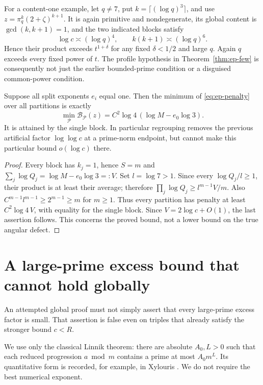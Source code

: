 For a content-one example, let $q\ne7$, put $k=\lceil(\log q)^3\rceil$, and
use $z=\pi_q^k(2+\zeta)^{k+1}$. It is again primitive and nondegenerate,
its global content is $\gcd(k,k+1)=1$, and the two indicated blocks satisfy
\[
 \log c\asymp(\log q)^4,\qquad k(k+1)\asymp(\log q)^6.
\]
Hence their product exceeds $t^{1+\delta}$ for any fixed $\delta<1/2$ and
large $q$. Again $q$ exceeds every fixed power of $t$. The profile hypothesis
in Theorem~\ref{thm:ep-few} is consequently not just the earlier bounded-prime
condition or a disguised common-power condition.

\begin{proposition}
\label{prop:ep-squarefree}
Suppose all split exponents $e_i$ equal one. Then the minimum of
\eqref{eq:ep-penalty} over all partitions is exactly
\[
 \min_{\mathcal P}\mathcal B_{\mathcal P}(z)
   =C^2\log4\,(\log M-e_0\log3).
\]
It is attained by the single block. In particular regrouping removes the
previous artificial factor $\log\log c$ at a prime-norm endpoint, but
cannot make this particular bound $o(\log c)$ there.
\end{proposition}
\begin{proof}
Every block has $k_j=1$, hence $S=m$ and
$\sum_j\log Q_j=\log M-e_0\log3=:V$. Set $l=\log7>1$.
Since every $\log Q_j/l\ge1$, their product is at least their average;
therefore $\prod_j\log Q_j\ge l^{m-1}V/m$.
Also $C^{m-1}l^{m-1}\ge2^{m-1}\ge m$ for $m\ge1$.
Thus every partition has penalty at least $C^2\log4\,V$, with equality
for the single block. Since $V=2\log c+O(1)$, the last assertion follows.
This concerns the proved bound, not a lower bound on the true angular defect.
\end{proof}

\section{A large-prime excess bound that cannot hold globally}
\label{sec:ep-obstruction}
An attempted global proof must not simply assert that every large-prime
excess factor is small. That assertion is false even on triples that already
satisfy the stronger bound $c<R$.

We use only the classical Linnik theorem: there are absolute $A_0,L>0$ such
that each reduced progression $a\bmod m$ contains a prime at most
$A_0m^L$. Its quantitative form is recorded, for example, in
Xylouris \cite{EPLinnik}. We do not require the best numerical exponent.

